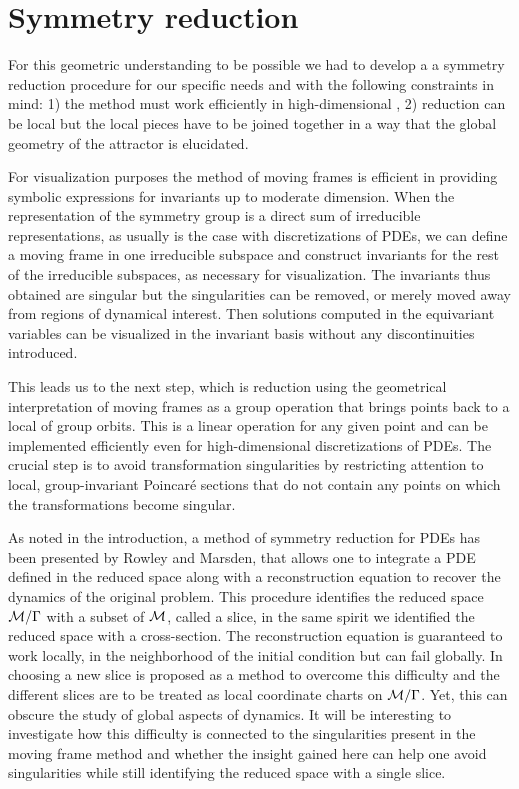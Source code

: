 \section{Symmetry reduction}

For this geometric understanding to be possible we had to develop a
a symmetry reduction procedure for our specific needs
and with the following
constraints in mind:
1) the method must work efficiently in high-dimensional \statesp, 2) reduction
can be local but the local pieces have to be joined together in
a way that the global geometry of the attractor is elucidated.

For visualization purposes the method of moving frames is efficient in providing
symbolic expressions for invariants up to moderate dimension. When the
representation of the symmetry group is a direct sum of irreducible representations,
as usually is the case with discretizations of PDEs, we can define a moving
frame in one irreducible subspace and construct invariants for the rest of
the irreducible subspaces, as necessary for visualization.
The invariants thus obtained are singular but the singularities can be removed,
or merely moved away from regions of dynamical interest.
Then solutions computed in the equivariant variables can be visualized
in the invariant basis without any discontinuities introduced.

This leads us to the next step, which is reduction using the
geometrical interpretation of moving frames as a group
operation that brings points back to a local {\csection} of
group orbits. This is a linear operation for any given point
and can be implemented efficiently even for high-dimensional
discretizations of PDEs. The crucial step is to avoid
transformation singularities by restricting attention to
local, group-invariant Poincar\'e sections that do not
contain any points on which the transformations become
singular.

As noted in the introduction, a method of symmetry reduction
for PDEs has been presented by Rowley and
Marsden, that allows one to
integrate a PDE defined in the reduced space along with a
reconstruction equation to recover the dynamics of the
original problem. This procedure identifies the reduced space
$\mathcal{M}/\Gamma$ with a subset of $\mathcal{M}$, called a slice, in
the same spirit we identified the reduced space with a
cross-section.
The reconstruction equation is guaranteed to
work locally, in the neighborhood of the initial condition
but can fail globally. In 
choosing a new slice is proposed as a method to overcome this
difficulty and the different slices are to be treated as
local coordinate charts on $\mathcal{M}/\Gamma$. Yet, this can
obscure the study of global aspects of dynamics. It will be
interesting to investigate how this difficulty is connected
to the singularities present in the moving frame method and
whether the insight gained here can help one avoid
singularities while still identifying the reduced space with
a single slice.


